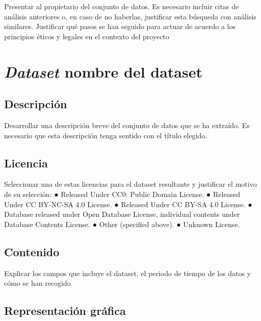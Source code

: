 \documentclass[12pt]{article}
\begin{document}
Presentar al propietario del conjunto de datos. Es necesario
incluir citas de análisis anteriores o, en caso de no haberlas, justificar esta
búsqueda con análisis similares. Justificar qué pasos se han seguido para
actuar de acuerdo a los principios éticos y legales en el contexto del proyecto

\vspace{-1.5em}\section*{\textit{Dataset} nombre del dataset}

\vspace{-1.5em}\subsection*{Descripción}\vspace{-1.5em}

Desarrollar una descripción breve del conjunto de
datos que se ha extraído. Es necesario que esta descripción tenga sentido con
el título elegido.

\vspace{-1.5em}\subsection*{Licencia}\vspace{-1.5em}

Seleccionar una de estas licencias para el dataset resultante y
justificar el motivo de su selección:
● Released Under CC0: Public Domain License.
● Released Under CC BY-NC-SA 4.0 License.
● Released Under CC BY-SA 4.0 License.
● Database released under Open Database License, individual contents
under Database Contents License.
● Other (specified above).
● Unknown License.

\vspace{-1.5em}\subsection*{Contenido}\vspace{-1.5em}

Explicar los campos que incluye el dataset, el periodo de tiempo de los datos y cómo se han recogido

\vspace{-1.5em}\subsection*{Representación gráfica}\vspace{-1.5em}
\end{document}
